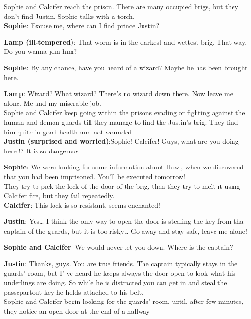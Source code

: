 Sophie and Calcifer reach the prison. There are many occupied brigs, but they don’t find Justin.
Sophie talks with a torch.\\

\textbf{Sophie}: Excuse me, where can I find prince Justin?

\textbf{Lamp (ill-tempered)}: That worm is in the darkest and wettest brig. That way. Do you wanna join him?

\textbf{Sophie}: By any chance, have you heard of a wizard? Maybe he has been brought here.

\textbf{Lamp}: Wizard? What wizard? There’s no wizard down there. Now leave me alone. Me and my miserable job.\\

\noindent Sophie and Calcifer keep going within the prisons evading or fighting against the human and demon guards till they manage to find the Justin’s brig. They find him quite in good health and not wounded.\\

\textbf{Justin (surprised and worried)}:Sophie! Calcifer! Guys, what are you doing here !? It is so dangerous

\textbf{Sophie}: We were looking for some information about Howl, when we discovered that you had been imprisoned. You’ll be executed tomorrow!\\

\noindent They try to pick the lock of the door of the brig, then they try to melt it using Calcifer fire, but they fail repeatedly.\\

\textbf{Calcifer}: This lock is so resistant, seems enchanted!

\textbf{Justin}: Yes… I think the only way to open the door is stealing the key from tha captain of the guards, but it is too risky… Go away and stay safe, leave me alone!

\textbf{Sophie and Calcifer}: We would never let you down. Where is the captain?

\textbf{Justin}: Thanks, guys. You are true friends. The captain typically stays in the guards’ room, but I’ ve heard he keeps always the door open to look what his underlings are doing. So while he is distracted you can get in and steal the passepartout key he holds attached to his belt.\\

\noindent Sophie and Calcifer begin looking for the guards’ room, until, after few minutes, they notice an open door  at the end of a hallway\\


